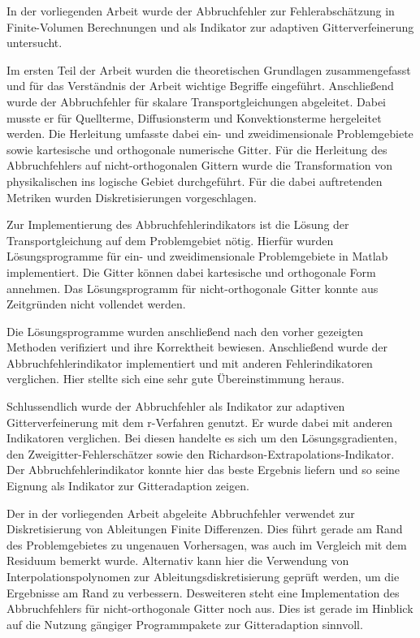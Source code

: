 In der vorliegenden Arbeit wurde der Abbruchfehler zur Fehlerabschätzung
in Finite-Volumen Berechnungen und als Indikator zur
adaptiven Gitterverfeinerung untersucht.

Im ersten Teil der Arbeit wurden die theoretischen Grundlagen zusammengefasst
und für das Verständnis der Arbeit wichtige Begriffe eingeführt.
Anschließend wurde der Abbruchfehler für skalare Transportgleichungen abgeleitet.
Dabei musste er für Quellterme, Diffusionsterm und Konvektionsterme hergeleitet werden.
Die Herleitung umfasste dabei ein- und zweidimensionale Problemgebiete sowie kartesische und orthogonale
numerische Gitter. Für die Herleitung des Abbruchfehlers auf nicht-orthogonalen Gittern
wurde die Transformation von physikalischen ins logische Gebiet durchgeführt. Für die
dabei auftretenden Metriken wurden Diskretisierungen vorgeschlagen.


Zur Implementierung des Abbruchfehlerindikators ist die Lösung der Transportgleichung
auf dem Problemgebiet nötig. Hierfür wurden Lösungsprogramme für ein- und zweidimensionale
Problemgebiete in Matlab implementiert. Die Gitter können dabei kartesische und orthogonale
Form annehmen. Das Lösungsprogramm für nicht-orthogonale Gitter konnte aus Zeitgründen nicht vollendet werden.

Die Lösungsprogramme wurden anschließend nach den vorher gezeigten Methoden
verifiziert und ihre Korrektheit bewiesen.
Anschließend wurde der Abbruchfehlerindikator implementiert und mit anderen Fehlerindikatoren verglichen.
Hier stellte sich eine sehr gute Übereinstimmung heraus.

Schlussendlich
wurde der Abbruchfehler als Indikator zur adaptiven Gitterverfeinerung mit dem r-Verfahren genutzt.
Er wurde dabei mit anderen Indikatoren verglichen. Bei diesen handelte es sich um den
Lösungsgradienten, den Zweigitter-Fehlerschätzer sowie den Richardson-Extrapolations-Indikator.
Der Abbruchfehlerindikator konnte hier das beste Ergebnis liefern und so seine Eignung
als Indikator zur Gitteradaption zeigen.

Der in der vorliegenden Arbeit abgeleite Abbruchfehler verwendet zur Diskretisierung von Ableitungen
Finite Differenzen. Dies führt gerade am Rand des Problemgebietes zu ungenauen Vorhersagen, was
auch im Vergleich mit dem Residuum bemerkt wurde.
Alternativ kann hier die Verwendung von Interpolationspolynomen 
zur Ableitungsdiskretisierung geprüft werden, um die Ergebnisse am Rand zu verbessern.
Desweiteren steht eine Implementation des Abbruchfehlers für nicht-orthogonale Gitter
noch aus. Dies ist gerade im Hinblick auf die Nutzung gängiger Programmpakete zur Gitteradaption
sinnvoll.

